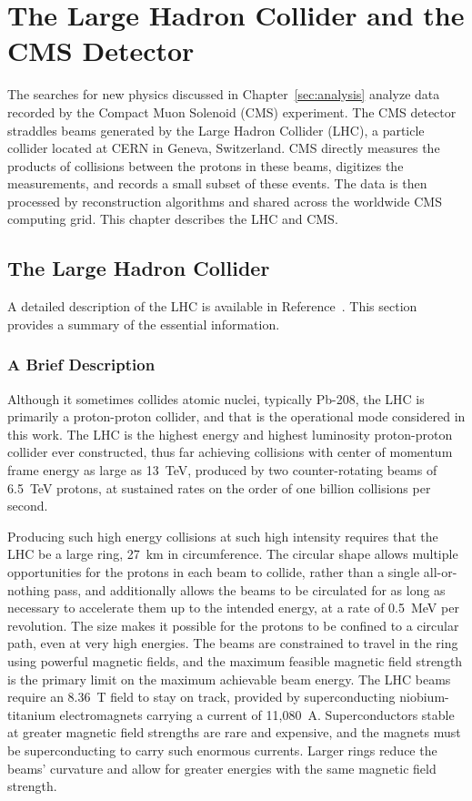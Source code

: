 \chapter{The Large Hadron Collider and the CMS Detector}

The searches for new physics discussed in Chapter~\ref{sec:analysis} analyze data recorded by the Compact Muon Solenoid (CMS) experiment.
The CMS detector straddles beams generated by the Large Hadron Collider (LHC), a particle collider located at CERN in Geneva, Switzerland.
CMS directly measures the products of collisions between the protons in these beams, digitizes the measurements, and records a small subset of these events.
The data is then processed by reconstruction algorithms and shared across the worldwide CMS computing grid.
This chapter describes the LHC and CMS.

\section{The Large Hadron Collider} \label{sec:LHC}

A detailed description of the LHC is available in Reference~\cite{LHC_TDR}.
This section provides a summary of the essential information.

  \subsection{A Brief Description} \label{sec:LHCdescription}

  Although it sometimes collides atomic nuclei, typically Pb-208, the LHC is primarily a proton-proton collider, and that is the operational mode considered in this work.
  The LHC is the highest energy and highest luminosity proton-proton collider ever constructed, thus far achieving collisions with center of momentum frame energy as large as 13~TeV, produced by two counter-rotating beams of 6.5~TeV protons, at sustained rates on the order of one billion collisions per second.

  Producing such high energy collisions at such high intensity requires that the LHC be a large ring, 27~km in circumference.
  The circular shape allows multiple opportunities for the protons in each beam to collide, rather than a single all-or-nothing pass, and additionally allows the beams to be circulated for as long as necessary to accelerate them up to the intended energy, at a rate of 0.5~MeV per revolution.
  The size makes it possible for the protons to be confined to a circular path, even at very high energies.
  The beams are constrained to travel in the ring using powerful magnetic fields, and the maximum feasible magnetic field strength is the primary limit on the maximum achievable beam energy.
  The LHC beams require an 8.36~T field to stay on track, provided by superconducting niobium-titanium electromagnets carrying a current of 11,080~A.
  Superconductors stable at greater magnetic field strengths are rare and expensive, and the magnets must be superconducting to carry such enormous currents.
  Larger rings reduce the beams' curvature and allow for greater energies with the same magnetic field strength.

